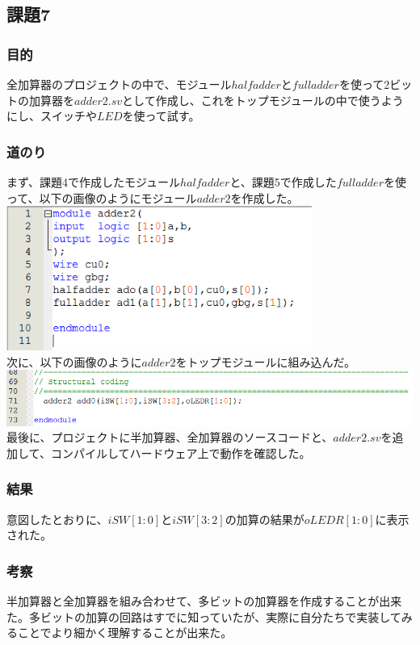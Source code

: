 \documentclass[a4paper]{jarticle}
\begin{document}
\subsection{課題7}
\subsubsection{目的}
全加算器のプロジェクトの中で、モジュール$halfadder$と$fulladder$を使って2ビットの加算器を$adder2.sv$として作成し、これをトップモジュールの中で使うようにし、スイッチや$LED$を使って試す。
\subsubsection{道のり}
まず、課題4で作成したモジュール$halfadder$と、課題5で作成した$fulladder$を使って、以下の画像のようにモジュール$adder2$を作成した。\\
\includegraphics[width=10cm]{work7/7-4.PNG}\\
次に、以下の画像のように$adder2$をトップモジュールに組み込んだ。\\
\includegraphics[width=15cm]{work7/7-1.PNG}\\
最後に、プロジェクトに半加算器、全加算器のソースコードと、$adder2.sv$を追加して、コンパイルしてハードウェア上で動作を確認した。
\subsubsection{結果}
意図したとおりに、$iSW[1:0]$と$iSW[3:2]$の加算の結果が$oLEDR[1:0]$に表示された。
\subsubsection{考察}
半加算器と全加算器を組み合わせて、多ビットの加算器を作成することが出来た。多ビットの加算の回路はすでに知っていたが、実際に自分たちで実装してみることでより細かく理解することが出来た。
\end{document}
